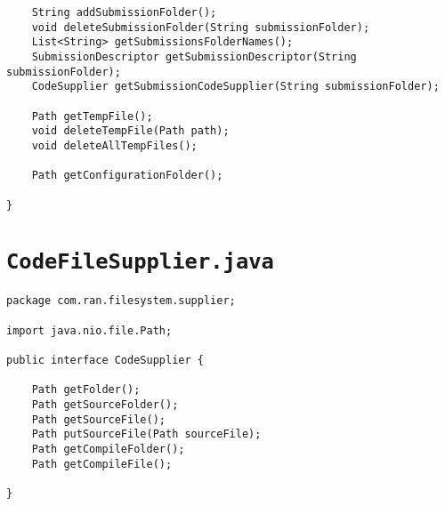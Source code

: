 \begin{verbatim}
    String addSubmissionFolder();
    void deleteSubmissionFolder(String submissionFolder);
    List<String> getSubmissionsFolderNames();
    SubmissionDescriptor getSubmissionDescriptor(String submissionFolder);
    CodeSupplier getSubmissionCodeSupplier(String submissionFolder);

    Path getTempFile();
    void deleteTempFile(Path path);
    void deleteAllTempFiles();

    Path getConfigurationFolder();
    
}
\end{verbatim}

\section*{\texttt{CodeFileSupplier.java}}
\begin{verbatim}
package com.ran.filesystem.supplier;

import java.nio.file.Path;

public interface CodeSupplier {

    Path getFolder();
    Path getSourceFolder();
    Path getSourceFile();
    Path putSourceFile(Path sourceFile);
    Path getCompileFolder();
    Path getCompileFile();

}
\end{verbatim}


